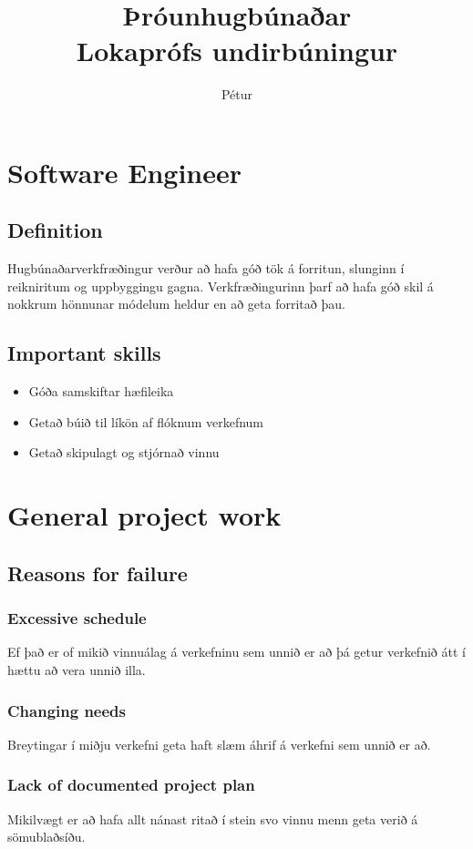 \documentclass[]{article}
\begin{document}
\title{Þróunhugbúnaðar \\
Lokaprófs undirbúningur}
\author{Pétur}
\maketitle

\pagebreak

\tableofcontents

\pagebreak

\section{Software Engineer}
\subsection{Definition}
Hugbúnaðarverkfræðingur verður að hafa góð tök á forritun, slunginn í reikniritum og uppbyggingu gagna. Verkfræðingurinn þarf að hafa góð skil á nokkrum hönnunar módelum heldur en að geta forritað þau.
\subsection{Important skills}
\begin{itemize}
	\item Góða samskiftar hæfileika
	\item Getað búið til líkön af flóknum verkefnum
	\item Getað skipulagt og stjórnað vinnu
\end{itemize}
\section{General project work}
\subsection{Reasons for failure}
\subsubsection{Excessive schedule}
Ef það er of mikið vinnuálag á verkefninu sem unnið er að þá getur verkefnið átt í hættu að vera unnið illa.
\subsubsection{Changing needs}
Breytingar í miðju verkefni geta haft slæm áhrif á verkefni sem unnið er að.
\subsubsection{Lack of documented project plan}
Mikilvægt er að hafa allt nánast ritað í stein svo vinnu menn geta verið á sömublaðsíðu.
\end{document}
